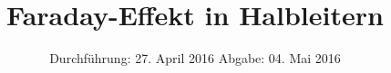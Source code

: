 

\subject{Fortgeschrittenen Praktikum - V46}
\title{Faraday-Effekt in Halbleitern}
\date{
  Durchführung: 27. April 2016
  \hspace{3em}
  Abgabe: 04. Mai 2016
}



\maketitle
\thispagestyle{empty}
\tableofcontents
\newpage






\printbibliography


